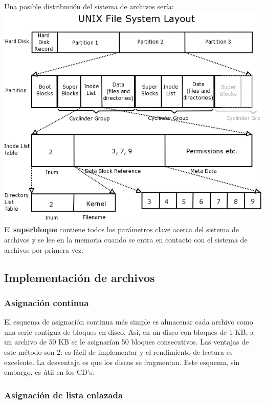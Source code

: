Una posible distribución del sistema de archivos sería:
\\


\includegraphics[scale=0.4]{imagenes/file-system.jpg}
\\


El \textbf{superbloque} contiene todos los parámetros clave acerca del sistema de archivos y se lee en la memoria cuando se entra en contacto con el sistema de archivos por primera vez.

\subsection{Implementación de archivos}

\subsubsection{Asignación continua}

El esquema de asignación continua más simple es almacenar cada archivo como una serie contigua de bloques en disco. Así, en un disco con bloques de 1 KB, a un archivo de 50 KB se le asignarían 50 bloques consecutivos. Las ventajas de este método son 2: es fácil de implementar y el rendimiento de lectura es excelente. La desventaja es que los discos se fragmentan. Este esquema, sin embargo, es útil en los CD's.

\subsubsection{Asignación de lista enlazada}

